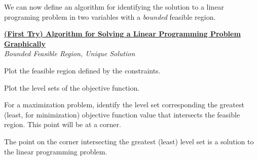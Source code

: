We can now define an algorithm for identifying the solution to a linear programing problem in two variables with a \textit{bounded} feasible region. 
\begin{algorithm}[H]
\captionsetup{labelformat=empty} %
\label{alg:GraphLPBoundedUniqueSoln}
\begin{center}
\begin{minipage}[t]{\textwidth-1em}
\underline{\textbf{(First Try) Algorithm for Solving a Linear Programming Problem Graphically}}\\
\textit{Bounded Feasible Region, Unique Solution}
\begin{enumerate*}
\item Plot the feasible region defined by the constraints.
\item Plot the level sets of the objective function.
\item For a maximization problem, identify the level set corresponding the greatest (least, for minimization) objective function value that intersects the feasible region. This point will be at a corner. 
\item The point on the corner intersecting the greatest (least) level set is a solution to the linear programming problem.  
\end{enumerate*}
\end{minipage}
\end{center}
\end{algorithm}

